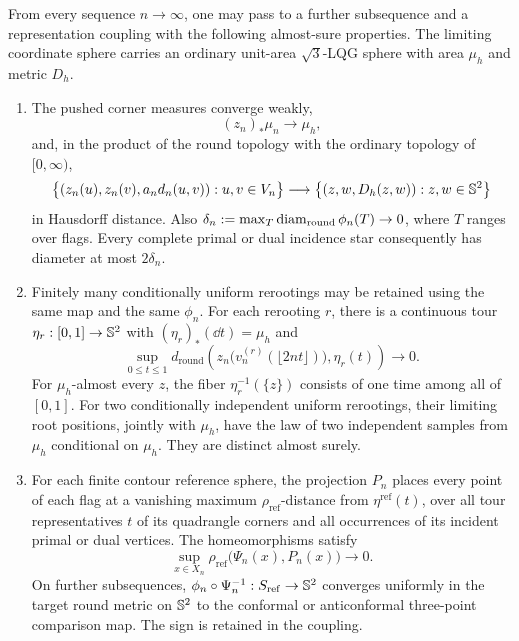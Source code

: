 \begin{proposition}\label{prop:geometry}
From every sequence \(n\to\infty\), one may pass to a further subsequence
and a representation coupling with the following almost-sure properties.
The limiting coordinate sphere carries an ordinary unit-area
\(\sqrt3\)-LQG sphere with area \(\mu_h\) and metric \(D_h\).
\begin{enumerate}[label=\textup{(\roman*)}]
\item The pushed corner measures converge weakly,
\[
 (z_n)_*\mu_n\longrightarrow\mu_h,
\]
and, in the product of the round topology with the ordinary topology of
\([0,\infty)\),
\begin{equation}\label{eq:common-distance-graph}
 \bigl\{(z_n(u),z_n(v),a_nd_n(u,v)):u,v\in V_n\bigr\}
 \longrightarrow
 \bigl\{(z,w,D_h(z,w)):z,w\in\mathbb S^2\bigr\}
\end{equation}
in Hausdorff distance.  Also
\(\delta_n:=\max_T\operatorname{diam}_{\mathrm{round}}\phi_n(T)\to0\), where \(T\) ranges
over flags.  Every complete primal or dual incidence star consequently has
diameter at most \(2\delta_n\).

\item Finitely many conditionally uniform rerootings may be retained using
the same map and the same \(\phi_n\).  For each rerooting \(r\), there is a
continuous tour \(\eta_r:[0,1]\to\mathbb S^2\) with
\((\eta_r)_*(\dd t)=\mu_h\) and
\begin{equation}\label{eq:uniform-tour-tracking}
 \sup_{0\le t\le1}
 d_{\mathrm{round}}\!\left(
 z_n\bigl(v_n^{(r)}(\lfloor 2nt\rfloor)\bigr),\eta_r(t)\right)
 \longrightarrow0.
\end{equation}
For \(\mu_h\)-almost every \(z\), the fiber
\(\eta_r^{-1}(\{z\})\) consists of one time among all of \([0,1]\).
For two conditionally independent uniform rerootings, their limiting root
positions, jointly with \(\mu_h\), have the law of two independent samples
from \(\mu_h\) conditional on \(\mu_h\).  They are distinct almost surely.

\item For each finite contour reference sphere, the projection \(P_n\)
places every point of each flag at a vanishing maximum
\(\rho_{\mathrm{ref}}\)-distance from \(\eta^{\mathrm{ref}}(t)\),
over all tour representatives \(t\) of its quadrangle corners and
all occurrences of its incident primal or dual vertices.  The
homeomorphisms satisfy
\[
 \sup_{x\in X_n}
 \rho_{\mathrm{ref}}\bigl(\Psi_n(x),P_n(x)\bigr)\longrightarrow0.
\]
On further subsequences,
\(\phi_n\circ\Psi_n^{-1}:S_{\mathrm{ref}}\to\mathbb S^2\) converges
uniformly in the target round metric on \(\mathbb S^2\) to the conformal or
anticonformal three-point comparison map.  The sign is retained in
the coupling.


\end{enumerate}
\end{proposition}
